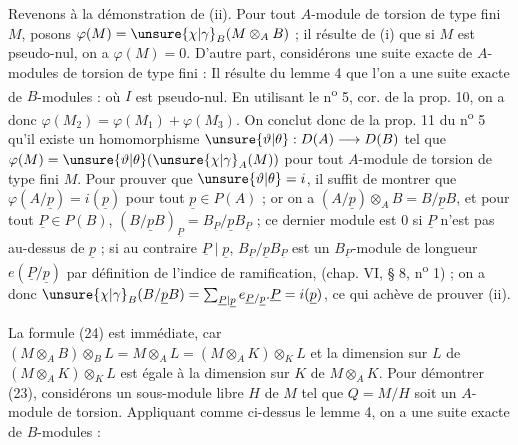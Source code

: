 Revenons à la démonstration de (ii). Pour tout $A$-module de torsion de type fini $M$, posons $\varphi(M)=\unsure{\chi|\gamma}_B(M\otimes_A B)$ ; il résulte de (i) que si $M$ est pseudo-nul, on a $\varphi(M)=0$. D'autre part, considérons une suite exacte de $A$-modules de torsion de type fini :
Il résulte du lemme 4 que l'on a une suite exacte de $B$-modules :
où $I$ est pseudo-nul. En utilisant le n\textsuperscript{o} 5, cor. de la prop. 10, on a donc $\varphi(M_2)=\varphi(M_1)+\varphi(M_3)$. On conclut donc de la prop. 11 du n\textsuperscript{o} 5 qu'il existe un homomorphisme $\unsure{\vartheta|\theta}:D(A)\longrightarrow D(B)$ tel que $\varphi(M)=\unsure{\vartheta|\theta}(\unsure{\chi|\gamma}_A(M))$ pour tout $A$-module de torsion de type fini $M$. Pour prouver que $\unsure{\vartheta|\theta}=i$, il suffit de montrer que $\varphi(A/\underline{p})=i(\underline{p})$ pour tout $\underline{p}\in P(A)$ ; or on a $(A/\underline{p})\otimes_A B=B/\underline{p}B$, et pour tout $\underline{P}\in P(B)$, $(B/\underline{p}B)_{\underline{P}}=B_{\underline{P}}/\underline{p}B_{\underline{P}}$ ; ce dernier module est $0$ si $\underline{P}$ n'est pas au-dessus de $\underline{p}$ ; si au contraire $\underline{P}\mid\underline{p}$, $B_{\underline{P}}/\underline{p}B_{\underline{P}}$ est un $B_{\underline{P}}$-module de longueur $e(\underline{P}/\underline{p})$ par définition de l'indice de ramification, (chap. VI, § 8, n\textsuperscript{o} 1) ; on a donc $\unsure{\chi|\gamma}_B(B/\underline{p}B)=\sum_{\underline{P}\mid\underline{p}}e_{\underline{P}/\underline{p}}.\underline{P}=i(\underline{p})$, ce qui achève de prouver (ii).

La formule (24) est immédiate, car $(M\otimes_A B)\otimes_B L=M\otimes_A L=(M\otimes_A K)\otimes_K L$ et la dimension sur $L$ de $(M\otimes_A K)\otimes_K L$ est égale à la dimension sur $K$ de $M\otimes_A K$. Pour démontrer (23), considérons un sous-module libre $H$ de $M$ tel que $Q=M/H$ soit un $A$-module de torsion. Appliquant comme ci-dessus le lemme 4, on a une suite exacte de $B$-modules :

